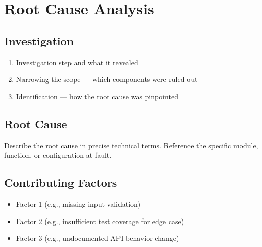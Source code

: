 \needspace{8cm}
\section{Root Cause Analysis}


\subsection{Investigation}


\begin{enumerate}
    \item Investigation step and what it revealed
    \item Narrowing the scope — which components were ruled out
    \item Identification — how the root cause was pinpointed
\end{enumerate}

\subsection{Root Cause}


\begin{technicaldetail}
Describe the root cause in precise technical terms. Reference the
specific module, function, or configuration at fault.
\end{technicaldetail}

%

\subsection{Contributing Factors}


\begin{itemize}
    \item Factor 1 (e.g., missing input validation)
    \item Factor 2 (e.g., insufficient test coverage for edge case)
    \item Factor 3 (e.g., undocumented API behavior change)
\end{itemize}
